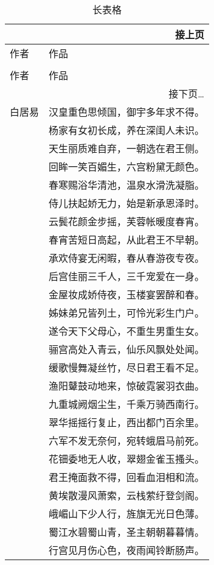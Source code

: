 \documentclass[UTF8]{article}
\begin{document}
\begin{longtable}{ll}
	\multicolumn{2}{r}{接上页} \\
	\toprule
	作者 & 作品 \\
	\midrule
	\endhead
\caption{长表格}\\
	\toprule
	作者 & 作品 \\
	\midrule
	\endfirsthead
	\bottomrule
	\multicolumn{2}{r}{接下页\dots}\\
	\endfoot
	\bottomrule
	\endlastfoot
	白居易 & 汉皇重色思倾国，御宇多年求不得。\\
	 & 杨家有女初长成，养在深闺人未识。\\
	& 天生丽质难自弃，一朝选在君王侧。\\
	 & 回眸一笑百媚生，六宫粉黛无颜色。\\
	& 春寒赐浴华清池，温泉水滑洗凝脂。\\
	 & 侍儿扶起娇无力，始是新承恩泽时。\\
	& 云鬓花颜金步摇，芙蓉帐暖度春宵。\\
	 & 春宵苦短日高起，从此君王不早朝。\\
	& 承欢侍宴无闲暇，春从春游夜专夜。\\
	 & 后宫佳丽三千人，三千宠爱在一身。\\
	& 金屋妆成娇侍夜，玉楼宴罢醉和春。\\
	 & 姊妹弟兄皆列土，可怜光彩生门户。\\
	& 遂令天下父母心，不重生男重生女。\\
	 & 骊宫高处入青云，仙乐风飘处处闻。\\
	& 缓歌慢舞凝丝竹，尽日君王看不足。\\
	 & 渔阳鼙鼓动地来，惊破霓裳羽衣曲。\\
	& 九重城阙烟尘生，千乘万骑西南行。\\
	 & 翠华摇摇行复止，西出都门百余里。\\
	& 六军不发无奈何，宛转蛾眉马前死。\\
	 & 花钿委地无人收，翠翅金雀玉搔头。\\
	& 君王掩面救不得，回看血泪相和流。\\
	 & 黄埃散漫风萧索，云栈萦纡登剑阁。\\
	& 峨嵋山下少人行，旌旗无光日色薄。\\
	 & 蜀江水碧蜀山青，圣主朝朝暮暮情。\\
	& 行宫见月伤心色，夜雨闻铃断肠声。\\
\end{longtable}
\end{document}
